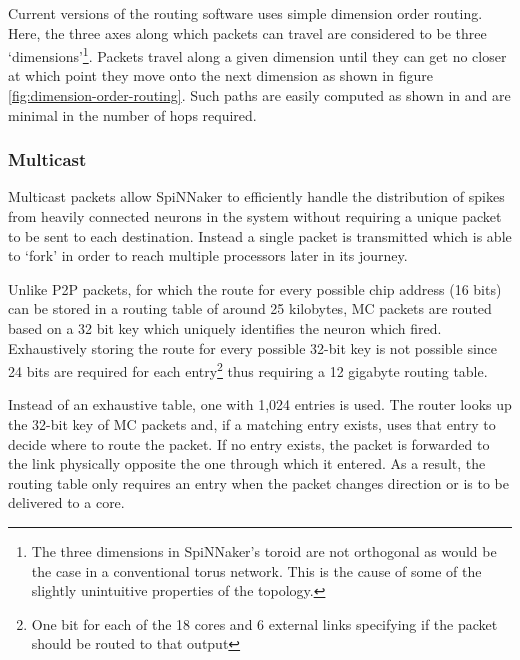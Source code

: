 				Current versions of the routing software uses simple dimension order
				routing. Here, the three axes along which packets can travel are
				considered to be three `dimensions'\footnote{The three dimensions in
				SpiNNaker's toroid are not orthogonal as would be the case in a
				conventional torus network. This is the cause of some of the slightly
				unintuitive properties of the topology.}. Packets travel along a given
				dimension until they can get no closer at which point they move onto the
				next dimension as shown in figure \ref{fig:dimension-order-routing}.
				Such paths are easily computed as shown in \cite{nocetti02} and are
				minimal in the number of hops required.
			
			\subsubsection{Multicast}
				
				
				Multicast packets allow SpiNNaker to efficiently handle the distribution
				of spikes from heavily connected neurons in the system without requiring a
				unique packet to be sent to each destination. Instead a
				single packet is transmitted which is able to `fork' in order to reach
				multiple processors later in its journey.
				
				Unlike P2P packets, for which the route for every possible chip address
				(16 bits) can be stored in a routing table of around 25 kilobytes, MC
				packets are routed based on a 32 bit key which uniquely identifies the
				neuron which fired.  Exhaustively storing the route for every possible
				32-bit key is not possible since 24 bits are required for each
				entry\footnote{One bit for each of the 18 cores and 6 external links
				specifying if the packet should be routed to that output} thus requiring
				a 12 gigabyte routing table.
				
				Instead of an exhaustive table, one with 1,024 entries is used. The
				router looks up the 32-bit key of MC packets and, if a matching entry
				exists, uses that entry to decide where to route the packet. If no entry
				exists, the packet is forwarded to the link physically opposite the one
				through which it entered. As a result, the routing table only requires
				an entry when the packet changes direction or is to be delivered to a
				core.
				
